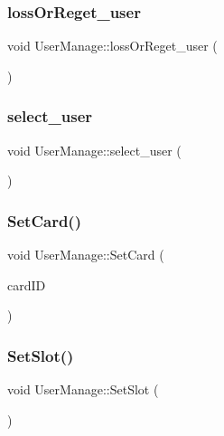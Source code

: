 \subsubsection{\texorpdfstring{lossOrReget\_user}{lossOrReget\_user}}
{\footnotesize\ttfamily void User\+Manage\+::loss\+Or\+Reget\+\_\+user (\begin{DoxyParamCaption}{ }\end{DoxyParamCaption})\hspace{0.3cm}{\ttfamily [slot]}}

\mbox{\label{class_user_manage_aa6252c8286f24959ec4b938054328bf7}} 
\subsubsection{\texorpdfstring{select\_user}{select\_user}}
{\footnotesize\ttfamily void User\+Manage\+::select\+\_\+user (\begin{DoxyParamCaption}{ }\end{DoxyParamCaption})\hspace{0.3cm}{\ttfamily [slot]}}

\mbox{\label{class_user_manage_ab4b39d4a967fc173c0a5ae5d3e2f2ef8}} 
\subsubsection{\texorpdfstring{SetCard()}{SetCard()}}
{\footnotesize\ttfamily void User\+Manage\+::\+Set\+Card (\begin{DoxyParamCaption}\item[{Q\+String}]{card\+ID }\end{DoxyParamCaption})}

\mbox{\label{class_user_manage_aa838d49f063bc0a081a1eb4d967c2da3}} 
\subsubsection{\texorpdfstring{SetSlot()}{SetSlot()}}
{\footnotesize\ttfamily void User\+Manage\+::\+Set\+Slot (\begin{DoxyParamCaption}{ }\end{DoxyParamCaption})}

